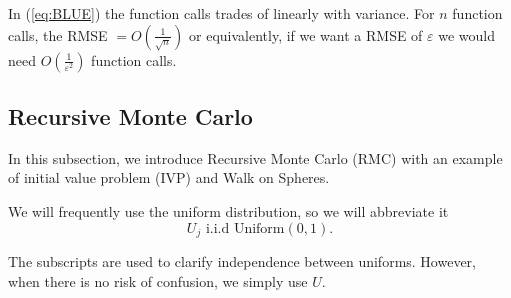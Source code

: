 \documentclass[a4paper,12pt]{article}
\begin{document}
\begin{example}
  In (\ref{eq:BLUE}) the function calls trades of
  linearly with variance. For $n$ function calls,
  the RMSE $= O\left(\frac{1}{\sqrt{n}}\right)$ or equivalently, if we want a
  RMSE of $\varepsilon$ we would need $O\left(\frac{1}{\varepsilon^{2}}\right)$
  function calls.
\end{example}


\subsection{Recursive Monte Carlo}
In this subsection, we introduce Recursive Monte Carlo (RMC)
with an example of initial value problem (IVP) and Walk on Spheres.

\begin{notation}[$U,U_{j}$]
  We will frequently use the uniform distribution, so we will abbreviate it
  \begin{equation}
    U_{j}  \text{ i.i.d Uniform}(0,1).
  \end{equation}

  The subscripts are used to clarify independence
  between uniforms. However,
  when there is no risk of confusion,
  we simply use $U.$
\end{notation}
\end{document}
